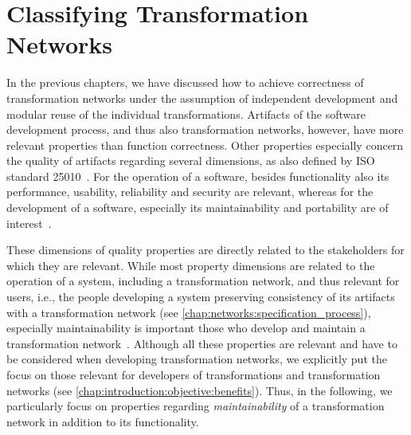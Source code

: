 \chapter{Classifying Transformation Networks
}
\label{chap:classification}

In the previous chapters, we have discussed how to achieve correctness of transformation networks under the assumption of independent development and modular reuse of the individual transformations.
Artifacts of the software development process, and thus also transformation networks, however, have more relevant properties than function correctness.
Other properties especially concern the quality of artifacts regarding several dimensions, as also defined by ISO standard 25010~\cite{iso25010}.
For the operation of a software, besides functionality also its performance, usability, reliability and security are relevant, whereas for the development of a software, especially its maintainability and portability are of interest~\cite[Tab. 2]{iso25010}.

These dimensions of quality properties are directly related to the stakeholders for which they are relevant.
While most property dimensions are related to the operation of a system, including a transformation network, and thus relevant for users, i.e., the people developing a system preserving consistency of its artifacts with a transformation network (see \autoref{chap:networks:specification_process}), especially maintainability is important those who develop and maintain a transformation network~\cite[Tab. 2]{iso25010}.
Although all these properties are relevant and have to be considered when developing transformation networks, we explicitly put the focus on those relevant for developers of transformations and transformation networks (see \autoref{chap:introduction:objective:benefits}).
Thus, in the following, we particularly focus on properties regarding \emph{maintainability} of a transformation network in addition to its functionality.

